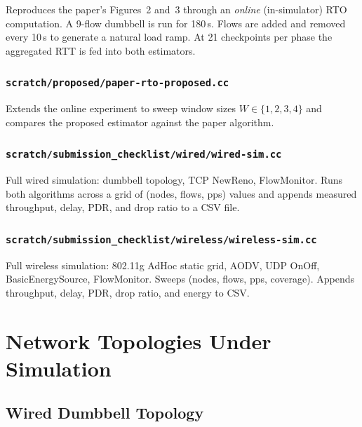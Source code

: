 \documentclass[12pt,a4paper]{report}
\begin{document}
Reproduces the paper's Figures~2 and~3 through an \emph{online} (in-simulator)
RTO computation.  A 9-flow dumbbell is run for 180\,s.  Flows are added and
removed every 10\,s to generate a natural load ramp.  At 21 checkpoints per
phase the aggregated RTT is fed into both estimators.

\subsection{\texttt{scratch/proposed/paper-rto-proposed.cc}}

Extends the online experiment to sweep window sizes $W \in \{1,2,3,4\}$ and
compares the proposed estimator against the paper algorithm.

\subsection{\texttt{scratch/submission\_checklist/wired/wired-sim.cc}}

Full wired simulation: dumbbell topology, TCP NewReno, FlowMonitor.
Runs both algorithms across a grid of (nodes, flows, pps) values and
appends measured throughput, delay, PDR, and drop ratio to a CSV file.

\subsection{\texttt{scratch/submission\_checklist/wireless/wireless-sim.cc}}

Full wireless simulation: 802.11g AdHoc static grid, AODV, UDP OnOff,
BasicEnergySource, FlowMonitor.  Sweeps (nodes, flows, pps, coverage).
Appends throughput, delay, PDR, drop ratio, and energy to CSV.

\chapter{Network Topologies Under Simulation}
\label{ch:topology}

\section{Wired Dumbbell Topology}
\end{document}
